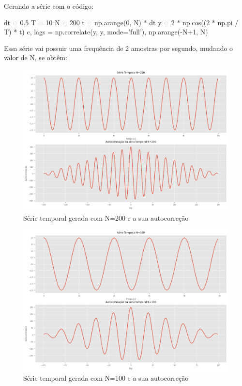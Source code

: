 \documentclass[12pt,a4paper,portuguese]{article}
\begin{document}
Gerando a série com o código:
\begin{python}
dt = 0.5
T = 10
N = 200
t = np.arange(0, N) * dt
y = 2 * np.cos((2 * np.pi / T) * t)
c, lags = np.correlate(y, y, mode='full'), np.arange(-N+1, N)
\end{python}
Essa série vai possuir uma frequência de 2 amostras por segundo, mudando o valor de N, se obtêm:
\begin{figure}[H]
	\centering
	\includegraphics[width=1\linewidth]{lista3-5-200}
	\caption{Série temporal gerada com N=200 e a sua autocorreção }
	\label{fig:lista3-5-200}
\end{figure}

\begin{figure}[H]
	\centering
	\includegraphics[width=1\linewidth]{lista3-5-100}
	\caption{Série temporal gerada com N=100 e a sua autocorreção }
	\label{fig:lista3-5-100}
\end{figure}
\end{document}
